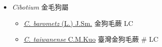 
  \begin{itemize}
 \item[    ] \textit{Cibotium} 金毛狗屬
                                
  \begin{itemize}
        \item[] \href{http://www.theplantlist.org/tpl1.1/search?q=Cibotium+barometz}{\textit{C. barometz} (L.) J.Sm.}   金狗毛蕨   LC
        \item[] \href{http://www.theplantlist.org/tpl1.1/search?q=Cibotium+taiwanense}{\textit{C. taiwanense} C.M.Kuo}   臺灣金狗毛蕨  \# LC
  \end{itemize}
  \end{itemize}
